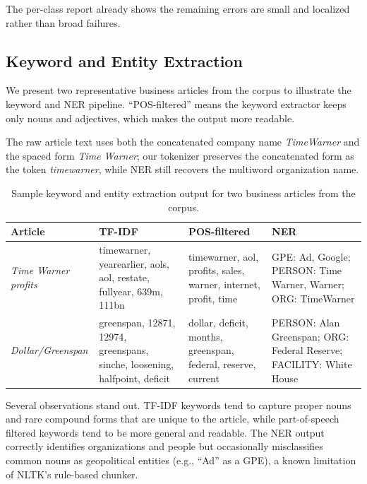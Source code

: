 The per-class report already shows the remaining errors are small and localized rather than broad failures.

\subsection{Keyword and Entity Extraction}

We present two representative business articles from the corpus to illustrate the keyword and NER pipeline. ``POS-filtered'' means the keyword extractor keeps only nouns and adjectives, which makes the output more readable.

The raw article text uses both the concatenated company name \textit{TimeWarner} and the spaced form \textit{Time Warner}; our tokenizer preserves the concatenated form as the token \textit{timewarner}, while NER still recovers the multiword organization name.

\begin{table}[t]
\centering
\small
\setlength{\tabcolsep}{4pt}
\begin{tabularx}{\textwidth}{@{}p{2.8cm}>{\raggedright\arraybackslash}X>{\raggedright\arraybackslash}X>{\raggedright\arraybackslash}X@{}}
\toprule
\textbf{Article} & \textbf{TF-IDF} & \textbf{POS-filtered} & \textbf{NER} \\
\midrule
\textit{Time Warner profits} & timewarner, yearearlier, aols, aol, restate, fullyear, 639m, 111bn & timewarner, aol, profits, sales, warner, internet, profit, time & GPE: Ad, Google; PERSON: Time Warner, Warner; ORG: TimeWarner \\
\bottomrule
\addlinespace
\textit{Dollar/Greenspan} & greenspan, 12871, 12974, greenspans, sinche, loosening, halfpoint, deficit & dollar, deficit, months, greenspan, federal, reserve, current & PERSON: Alan Greenspan; ORG: Federal Reserve; FACILITY: White House \\
\bottomrule
\end{tabularx}
\caption{Sample keyword and entity extraction output for two business articles from the corpus.}
\label{tab:samples}
\end{table}

Several observations stand out. TF-IDF keywords tend to capture proper nouns and rare compound forms that are unique to the article, while part-of-speech filtered keywords tend to be more general and readable. The NER output correctly identifies organizations and people but occasionally misclassifies common nouns as geopolitical entities (e.g., ``Ad'' as a GPE), a known limitation of NLTK's rule-based chunker.

